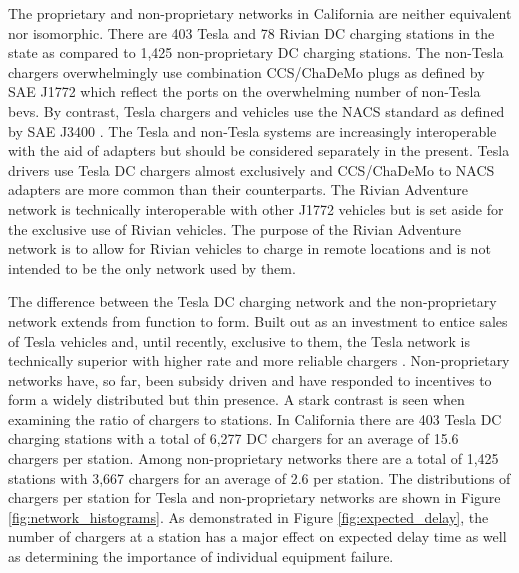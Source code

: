 \documentclass[11pt]{article}
\begin{document}
\begin{multicols}{2}
The proprietary and non-proprietary networks in California are neither equivalent nor isomorphic. There are 403 Tesla and 78 Rivian DC charging stations in the state as compared to 1,425 non-proprietary DC charging stations. The non-Tesla chargers overwhelmingly use combination CCS/ChaDeMo plugs as defined by SAE J1772 \cite{SAE_J1772} which reflect the ports on the overwhelming number of non-Tesla \glspl{bev}. By contrast, Tesla chargers and vehicles use the NACS standard as defined by SAE J3400 \cite{SAE_J3400}. The Tesla and non-Tesla systems are increasingly interoperable with the aid of adapters but should be considered separately in the present. Tesla drivers use Tesla DC chargers almost exclusively \cite{Visaria_2022} and CCS/ChaDeMo to NACS adapters are more common than their counterparts. The Rivian Adventure network is technically interoperable with other J1772 vehicles but is set aside for the exclusive use of Rivian vehicles. The purpose of the Rivian Adventure network is to allow for Rivian vehicles to charge in remote locations and is not intended to be the only network used by them.

The difference between the Tesla DC charging network and the non-proprietary network extends from function to form. Built out as an investment to entice sales of Tesla vehicles and, until recently, exclusive to them, the Tesla network is technically superior with higher rate and more reliable chargers \cite{Rempel_2023, Kozumplik_2022}. Non-proprietary networks have, so far, been subsidy driven \cite{Gamage_2023} and have responded to incentives to form a widely distributed but thin presence. A stark contrast is seen when examining the ratio of chargers to stations. In California there are 403 Tesla DC charging stations with a total of 6,277 DC chargers for an average of 15.6 chargers per station. Among non-proprietary networks there are a total of 1,425 stations with 3,667 chargers for an average of 2.6 per station. The distributions of chargers per station for Tesla and non-proprietary networks are shown in Figure \ref{fig:network_histograms}. As demonstrated in Figure \ref{fig:expected_delay}, the number of chargers at a station has a major effect on expected delay time as well as determining the importance of individual equipment failure. 


\end{multicols}
\end{document}
